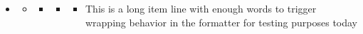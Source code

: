 \documentclass{article}
\begin{document}
\begin{itemize}
\item
\begin{itemize}
\item
\begin{itemize}
\item
\begin{itemize}
\item
\begin{itemize}
\item This is a long item line with enough words to trigger wrapping behavior in the formatter for testing purposes today
\end{itemize}
\end{itemize}
\end{itemize}
\end{itemize}
\end{itemize}
\end{document}
